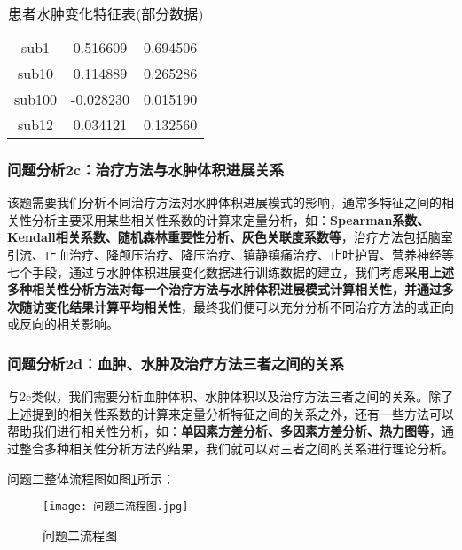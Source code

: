 \documentclass[bwprint]{gmcmthesis}
\begin{document}
				\begin{table}[H]
					\caption{患者水肿变化特征表(部分数据)}
					\label{tab:7}
					\begin{tabular}{ccc}
						\toprule[1.5pt]
						\makebox[0.3\textwidth][c]{ID} &
						\makebox[0.3\textwidth][c]{Mean} & \makebox[0.4\textwidth][c]{Standard} \\
						\midrule[1pt]
						sub1 & 0.516609 & 0.694506\\
						sub10 & 0.114889 & 0.265286\\
						sub100 & -0.028230 & 0.015190\\
						sub12 & 0.034121 & 0.132560\\
						\bottomrule[1.5pt]
					\end{tabular}			
				\end{table}
			
			\subsubsection{问题分析2c：治疗方法与水肿体积进展关系}
				该题需要我们分析不同治疗方法对水肿体积进展模式的影响，通常多特征之间的相关性分析主要采用某些相关性系数的计算来定量分析，如：\textbf{Spearman系数、Kendall相关系数、随机森林重要性分析、灰色关联度系数等}，治疗方法包括脑室引流、止血治疗、降颅压治疗、降压治疗、镇静镇痛治疗、止吐护胃、营养神经等七个手段，通过与水肿体积进展变化数据进行训练数据的建立，我们考虑\textbf{采用上述多种相关性分析方法对每一个治疗方法与水肿体积进展模式计算相关性，并通过多次随访变化结果计算平均相关性}，最终我们便可以充分分析不同治疗方法的或正向或反向的相关影响。
			
			\subsubsection{问题分析2d：血肿、水肿及治疗方法三者之间的关系}
				与2c类似，我们需要分析血肿体积、水肿体积以及治疗方法三者之间的关系。除了上述提到的相关性系数的计算来定量分析特征之间的关系之外，还有一些方法可以帮助我们进行相关性分析，如：\textbf{单因素方差分析、多因素方差分析、热力图等}，通过整合多种相关性分析方法的结果，我们就可以对三者之间的关系进行理论分析。
				
				问题二整体流程图如图\ref{fig:16}所示：
				
				\begin{figure}[H]
					\centering
					\texttt{[image: 问题二流程图.jpg]}
					\caption{问题二流程图}
					\label{fig:16}
				\end{figure}
				
\end{document}
